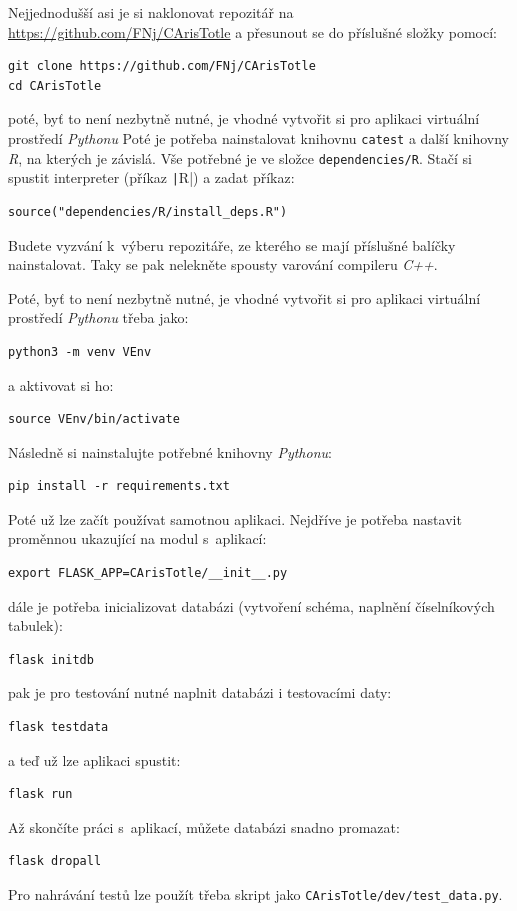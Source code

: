 \documentclass[a4paper,twoside,12pt]{scrbook}
\begin{document}
Nejjednodušší asi je si naklonovat repozitář na \url{https://github.com/FNj/CArisTotle} a přesunout se do příslušné složky pomocí:
\begin{verbatim}
git clone https://github.com/FNj/CArisTotle
cd CArisTotle
\end{verbatim}
poté, byť to není nezbytně nutné, je vhodné vytvořit si pro aplikaci virtuální prostředí \textit{Pythonu}
Poté je potřeba nainstalovat knihovnu \texttt{catest} a další knihovny \textit{R}, na kterých je závislá. Vše potřebné je ve složce \texttt{dependencies/R}. Stačí si spustit interpreter (příkaz \texttt|R|) a zadat příkaz:
\begin{verbatim}
source("dependencies/R/install_deps.R")
\end{verbatim}
Budete vyzvání k~výberu repozitáře, ze kterého se mají příslušné balíčky nainstalovat. Taky se pak nelekněte spousty varování compileru \textit{C++}.

Poté, byť to není nezbytně nutné, je vhodné vytvořit si pro aplikaci virtuální prostředí \textit{Pythonu} třeba jako:
\begin{verbatim}
python3 -m venv VEnv
\end{verbatim}
a aktivovat si ho:
\begin{verbatim}
source VEnv/bin/activate
\end{verbatim}

Následně si nainstalujte potřebné knihovny \textit{Pythonu}:
\begin{verbatim}
pip install -r requirements.txt
\end{verbatim}

Poté už lze začít používat samotnou aplikaci. Nejdříve je potřeba nastavit proměnnou ukazující na modul s~aplikací:
\begin{verbatim}
export FLASK_APP=CArisTotle/__init__.py
\end{verbatim}
dále je potřeba inicializovat databázi (vytvoření schéma, naplnění číselníkových tabulek):
\begin{verbatim}
flask initdb
\end{verbatim}
pak je pro testování nutné naplnit databázi i testovacími daty:
\begin{verbatim}
flask testdata
\end{verbatim}
a teď už lze aplikaci spustit:
\begin{verbatim}
flask run
\end{verbatim}

Až skončíte práci s~aplikací, můžete databázi snadno promazat:
\begin{verbatim}
flask dropall
\end{verbatim}

Pro nahrávání testů lze použít třeba skript jako \texttt{CArisTotle/dev/test\_data.py}.
\end{document}
